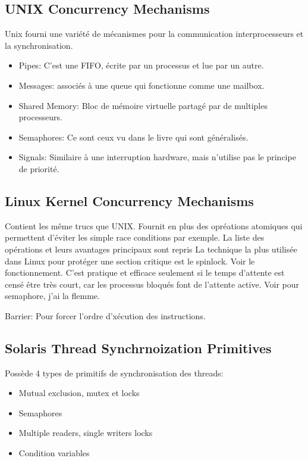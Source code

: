 \subsection{UNIX Concurrency Mechanisms}
Unix fourni une variété de mécanismes pour la communication interprocesseurs et la synchronisation.
\begin{itemize}
  \item Pipes: C'est une FIFO, écrite par un processus et lue par un autre.
  \item Messages: associés à une queue qui fonctionne comme une mailbox.
  \item Shared Memory: Bloc de mémoire virtuelle partagé par de multiples processeurs.
  \item Semaphores: Ce sont ceux vu dans le livre qui sont généralisés.
  \item Signals: Similaire à une interruption hardware, mais n'utilise pas le principe de priorité.
\end{itemize}

\subsection{Linux Kernel Concurrency Mechanisms}
Contient les même trucs que UNIX.
Fournit en plus des opréations atomiques qui permettent d'éviter les simple race conditions par exemple.
La liste des opérations et leurs avantages principaux sont repris \cite[p.~286,287]{stallings}
La technique la plus utilisée dans Linux pour protéger une section critique est le spinlock.
Voir le fonctionnement.
C'est pratique et efficace seulement si le temps d'attente est censé être très court, car les processus bloqués font de l'attente active.
Voir pour semaphore, j'ai la flemme.

Barrier: Pour forcer l'ordre d'xécution des instructions.

\subsection{Solaris Thread Synchrnoization Primitives}
Possède 4 types de primitifs de synchronisation des threads:
\begin{itemize}
  \item Mutual exclusion, mutex et locks
  \item Semaphores
  \item Multiple readers, single writers locks
  \item Condition variables
\end{itemize}

